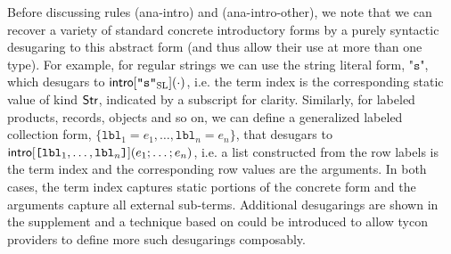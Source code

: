 \documentclass[10pt,preprint]{sigplanconf}
\begin{document}
Before discussing rules (ana-intro) and (ana-intro-other), we note that we can recover a variety of standard concrete introductory forms by a purely syntactic desugaring to this abstract form (and thus allow their use at more than one type). For example, for regular strings we can use the string literal form, $\texttt{"s"}$, which desugars to ${\sf intro}[\texttt{"s"}_\text{SL}](\cdot)$, i.e. the term index is the corresponding static value of kind ${\sf Str}$, indicated by a subscript for clarity. Similarly, for labeled products, records, objects and so on, we can define a generalized labeled collection form, $\{\mathtt{lbl}_1=e_1, \ldots, \mathtt{lbl}_n=e_n\}$, that desugars to ${\sf intro}[\texttt{[}\mathtt{lbl}_1, \ldots, \mathtt{lbl}_n\texttt{]}](e_1; \ldots; e_n)$, i.e. a list constructed from the row labels is the term index and the corresponding row values are the arguments. In both cases, the term index captures  static portions of the concrete form and the arguments capture all external sub-terms. Additional desugarings are shown in the supplement and a technique based on \cite{TSLs} could be introduced to allow tycon providers to define more such desugarings  composably. 
\end{document}

